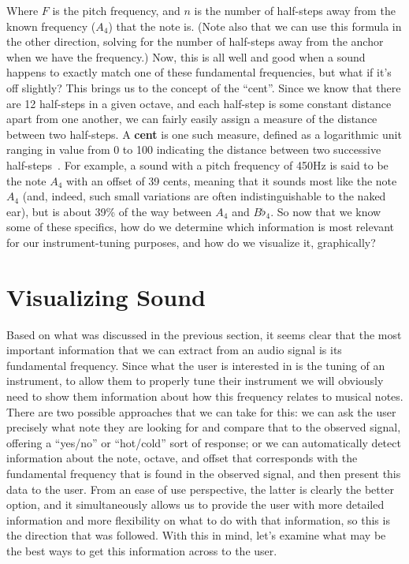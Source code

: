 \documentclass[12pt]{report}
\begin{document}
\indent Where $F$ is the pitch frequency, and $n$ is the number of half-steps away from the known frequency ($A_4$) that the note is. (Note also that we can use this formula in the other direction, solving for the number of half-steps away from the anchor when we have the frequency.) Now, this is all well and good when a sound happens to exactly match one of these fundamental frequencies, but what if it's off slightly? This brings us to the concept of the ``cent''. Since we know that there are 12 half-steps in a given octave, and each half-step is some constant distance apart from one another, we can fairly easily assign a measure of the distance between two half-steps. A {\bf cent} is one such measure, defined as a logarithmic unit ranging in value from 0 to 100 indicating the distance between two successive half-steps~\cite{Suits-nd}. For example, a sound with a pitch frequency of 450Hz is said to be the note $A_4$ with an offset of 39 cents, meaning that it sounds most like the note $A_4$ (and, indeed, such small variations are often indistinguishable to the naked ear), but is about 39\% of the way between $A_4$ and $B\flat_4$. So now that we know some of these specifics, how do we determine which information is most relevant for our instrument-tuning purposes, and how do we visualize it, graphically?


\section{Visualizing Sound}
\label{sec:vissnd}
\indent Based on what was discussed in the previous section, it seems clear that the most important information that we can extract from an audio signal is its fundamental frequency. Since what the user is interested in is the tuning of an instrument, to allow them to properly tune their instrument we will obviously need to show them information about how this frequency relates to musical notes. There are two possible approaches that we can take for this: we can ask the user precisely what note they are looking for and compare that to the observed signal, offering a ``yes\slash no'' or ``hot\slash cold'' sort of response; or we can automatically detect information about the note, octave, and offset that corresponds with the fundamental frequency that is found in the observed signal, and then present this data to the user. From an ease of use perspective, the latter is clearly the better option, and it simultaneously allows us to provide the user with more detailed information and more flexibility on what to do with that information, so this is the direction that was followed. With this in mind, let's examine what may be the best ways to get this information across to the user.
\end{document}
